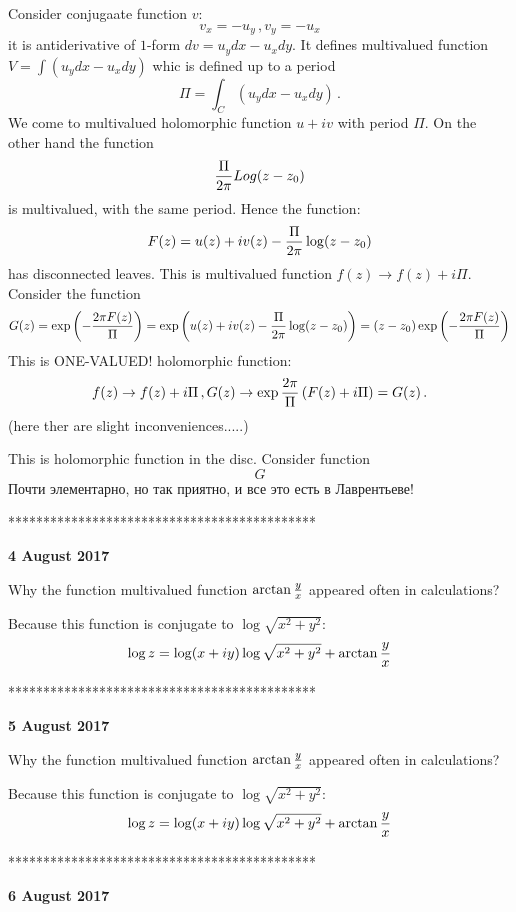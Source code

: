 Consider conjugaate function $v$:
       $$
v_x=-u_y\,,v_y=-u_x
       $$
it is antiderivative of $1$-form
$dv=u_ydx-u_xdy$. It defines
multivalued function
    $
V=\int (u_ydx-u_xdy)
    $
whic is defined up to a period
     $$
\Pi=\int_{C}(u_ydx-u_xdy)\,.
  $$
  We come to multivalued holomorphic function
$u+iv$ with period $\Pi$. On the other hand 
the function
     $$
{\Pi\over 2\pi}Log (z-z_0)
     $$
    is multivalued, with the same period.
Hence the function:
        $$
F(z)=u(z)+iv(z)-
{\Pi\over 2\pi}\log (z-z_0)
        $$
has disconnected leaves.  This is multivalued
function $f(z)\to f(z)+i\Pi$. Consider the function
        $$
G(z)=\exp\left(-{2\pi F(z)\over \Pi}\right)=
\exp\left( u(z)+iv(z)-
{\Pi\over 2\pi}\log (z-z_0)\right)=
 (z-z_0)\exp\left(-{2\pi F(z)\over \Pi}\right)
        $$
This is ONE-VALUED! holomorphic function:
        $$
   f(z)\to f(z)+i\Pi\,, G(z)\to 
   \exp{{2\pi\over \Pi}\left(F(z)+i\Pi\right)}=G(z)\,.
         $$
(here ther are slight inconveniences.....)

 
  This is holomorphic function in the disc.
Consider function
           $$
    G
           $$
   Почти элементарно, но так приятно,
и все это есть в Лаврентьеве!


********************************************


\bigskip

\centerline  {\bf  4 August 2017}
     Why the function multivalued function
$\arctan {y\over x}$
appeared often in calculations?

Because this function is conjugate to
$\log \sqrt {x^2+y^2}$:
           $$
\log z=\log (x+iy)\log \sqrt {x^2+y^2}
+\arctan {y\over x}
           $$



********************************************



\bigskip

\centerline  {\bf 5 August 2017}
     Why the function multivalued function
$\arctan {y\over x}$
appeared often in calculations?

Because this function is conjugate to
$\log \sqrt {x^2+y^2}$:
           $$
\log z=\log (x+iy)\log \sqrt {x^2+y^2}
+\arctan {y\over x}
           $$



********************************************



\bigskip

\centerline  {\bf   6 August 2017}


